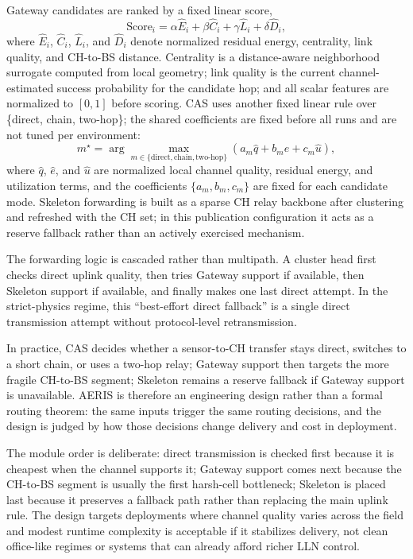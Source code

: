 \documentclass[conference]{IEEEtran}
\begin{document}
Gateway candidates are ranked by a fixed linear score,
\begin{equation}
\mathrm{Score}_i = \alpha \hat{E}_i + \beta \hat{C}_i + \gamma \hat{L}_i + \delta \hat{D}_i,
\end{equation}
where $\hat{E}_i$, $\hat{C}_i$, $\hat{L}_i$, and $\hat{D}_i$ denote normalized residual energy, centrality, link quality, and CH-to-BS distance. Centrality is a distance-aware neighborhood surrogate computed from local geometry; link quality is the current channel-estimated success probability for the candidate hop; and all scalar features are normalized to $[0,1]$ before scoring. CAS uses another fixed linear rule over \{direct, chain, two-hop\}; the shared coefficients are fixed before all runs and are not tuned per environment:
\begin{equation}
m^{\star}=\arg\max_{m \in \{\mathrm{direct},\mathrm{chain},\mathrm{two\mbox{-}hop}\}} \left( a_m \hat{q} + b_m \hat{e} + c_m \hat{u} \right),
\end{equation}
where $\hat{q}$, $\hat{e}$, and $\hat{u}$ are normalized local channel quality, residual energy, and utilization terms, and the coefficients $\{a_m,b_m,c_m\}$ are fixed for each candidate mode. Skeleton forwarding is built as a sparse CH relay backbone after clustering and refreshed with the CH set; in this publication configuration it acts as a reserve fallback rather than an actively exercised mechanism.

The forwarding logic is cascaded rather than multipath. A cluster head first checks direct uplink quality, then tries Gateway support if available, then Skeleton support if available, and finally makes one last direct attempt. In the strict-physics regime, this ``best-effort direct fallback'' is a single direct transmission attempt without protocol-level retransmission.

In practice, CAS decides whether a sensor-to-CH transfer stays direct, switches to a short chain, or uses a two-hop relay; Gateway support then targets the more fragile CH-to-BS segment; Skeleton remains a reserve fallback if Gateway support is unavailable. AERIS is therefore an engineering design rather than a formal routing theorem: the same inputs trigger the same routing decisions, and the design is judged by how those decisions change delivery and cost in deployment.

The module order is deliberate: direct transmission is checked first because it is cheapest when the channel supports it; Gateway support comes next because the CH-to-BS segment is usually the first harsh-cell bottleneck; Skeleton is placed last because it preserves a fallback path rather than replacing the main uplink rule. The design targets deployments where channel quality varies across the field and modest runtime complexity is acceptable if it stabilizes delivery, not clean office-like regimes or systems that can already afford richer LLN control.
\end{document}
